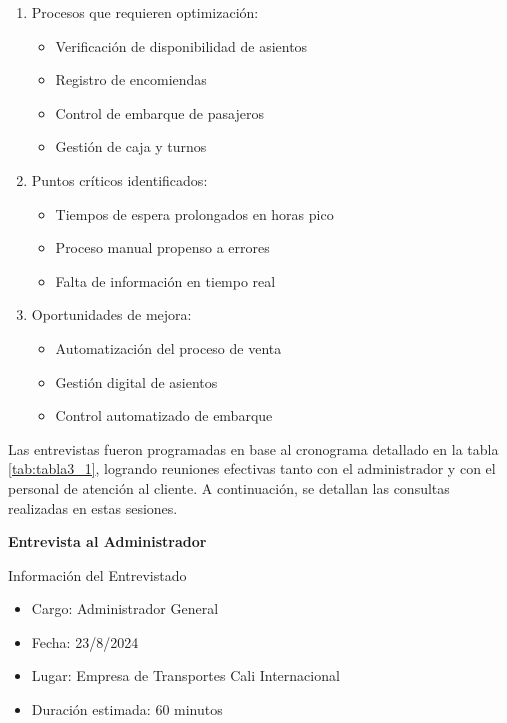 	\begin{enumerate}[left=0.1cm, labelsep = 0.9cm, topsep = 0pt, parsep = 0pt]
		\item Procesos que requieren optimización:
		\begin{itemize}[label=$-$, left=0cm, labelsep = 0.9cm, topsep = 0pt, parsep = 0pt]
			\item Verificación de disponibilidad de asientos
			\item Registro de encomiendas
			\item Control de embarque de pasajeros
			\item Gestión de caja y turnos
		\end{itemize}		
		\item Puntos críticos identificados:
		\begin{itemize}[label=$-$, left=0cm, labelsep = 0.9cm, topsep = 0pt, parsep = 0pt]
			\item Tiempos de espera prolongados en horas pico
			\item Proceso manual propenso a errores
			\item Falta de información en tiempo real
		\end{itemize}
		\item Oportunidades de mejora:
		\begin{itemize}[label=$-$, left=0cm, labelsep = 0.9cm, topsep = 0pt, parsep = 0pt]
			\item Automatización del proceso de venta
			\item Gestión digital de asientos
			\item Control automatizado de embarque
		\end{itemize}
	\end{enumerate}
		
	Las entrevistas fueron programadas en base al cronograma detallado en la tabla \ref{tab:tabla3_1}, logrando reuniones efectivas tanto con el administrador y con el personal de atención al cliente. A continuación, se detallan las consultas realizadas en estas sesiones.
		
	\textbf{Entrevista al Administrador}
	
	Información del Entrevistado
	\begin{itemize}[label=$-$, left=0cm, labelsep = 0.9cm, topsep = 0pt, parsep = 0pt]
		\item Cargo: Administrador General
		\item Fecha: 23/8/2024
		\item Lugar: Empresa de Transportes Cali Internacional
		\item Duración estimada: 60 minutos
	\end{itemize}
	
